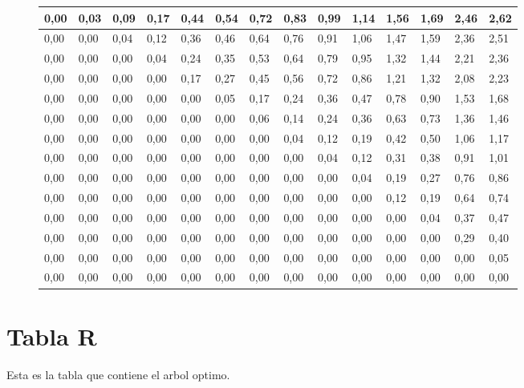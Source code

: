 \documentclass{article}
\begin{document}
\centering 
\begin{figure}[H]
\label{my-label2}
\begin{tabular}{|l|l|l|l|l|l|l|l|l|l|l|l|l|l|}
\hline
0,00& 0,03& 0,09& 0,17& 0,44& 0,54& 0,72& 0,83& 0,99& 1,14& 1,56& 1,69& 2,46& 2,62\\ \hline
0,00& 0,00& 0,04& 0,12& 0,36& 0,46& 0,64& 0,76& 0,91& 1,06& 1,47& 1,59& 2,36& 2,51\\ \hline
0,00& 0,00& 0,00& 0,04& 0,24& 0,35& 0,53& 0,64& 0,79& 0,95& 1,32& 1,44& 2,21& 2,36\\ \hline
0,00& 0,00& 0,00& 0,00& 0,17& 0,27& 0,45& 0,56& 0,72& 0,86& 1,21& 1,32& 2,08& 2,23\\ \hline
0,00& 0,00& 0,00& 0,00& 0,00& 0,05& 0,17& 0,24& 0,36& 0,47& 0,78& 0,90& 1,53& 1,68\\ \hline
0,00& 0,00& 0,00& 0,00& 0,00& 0,00& 0,06& 0,14& 0,24& 0,36& 0,63& 0,73& 1,36& 1,46\\ \hline
0,00& 0,00& 0,00& 0,00& 0,00& 0,00& 0,00& 0,04& 0,12& 0,19& 0,42& 0,50& 1,06& 1,17\\ \hline
0,00& 0,00& 0,00& 0,00& 0,00& 0,00& 0,00& 0,00& 0,04& 0,12& 0,31& 0,38& 0,91& 1,01\\ \hline
0,00& 0,00& 0,00& 0,00& 0,00& 0,00& 0,00& 0,00& 0,00& 0,04& 0,19& 0,27& 0,76& 0,86\\ \hline
0,00& 0,00& 0,00& 0,00& 0,00& 0,00& 0,00& 0,00& 0,00& 0,00& 0,12& 0,19& 0,64& 0,74\\ \hline
0,00& 0,00& 0,00& 0,00& 0,00& 0,00& 0,00& 0,00& 0,00& 0,00& 0,00& 0,04& 0,37& 0,47\\ \hline
0,00& 0,00& 0,00& 0,00& 0,00& 0,00& 0,00& 0,00& 0,00& 0,00& 0,00& 0,00& 0,29& 0,40\\ \hline
0,00& 0,00& 0,00& 0,00& 0,00& 0,00& 0,00& 0,00& 0,00& 0,00& 0,00& 0,00& 0,00& 0,05\\ \hline
0,00& 0,00& 0,00& 0,00& 0,00& 0,00& 0,00& 0,00& 0,00& 0,00& 0,00& 0,00& 0,00& 0,00\\ \hline
\end{tabular}
\end{figure}
    
\section{Tabla R}
Esta es la tabla que contiene el arbol optimo.
\end{document}
